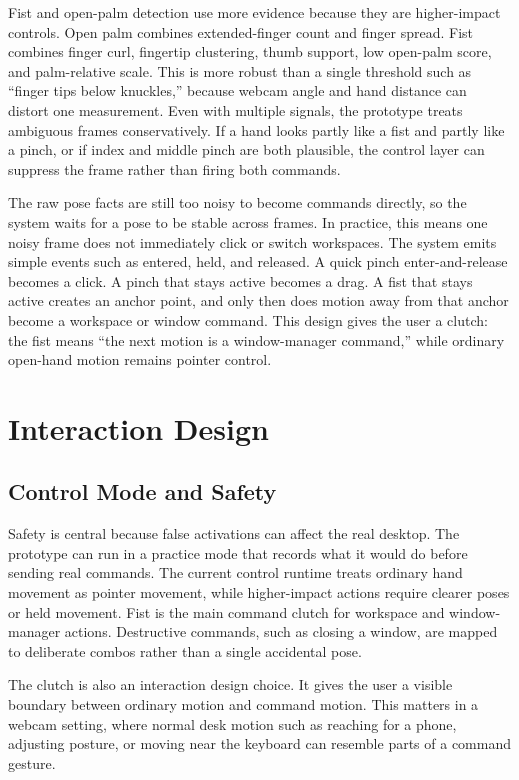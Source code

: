 \documentclass[manuscript]{acmart}
\begin{document}
Fist and open-palm detection use more evidence because they are higher-impact controls. Open palm combines extended-finger count and finger spread. Fist combines finger curl, fingertip clustering, thumb support, low open-palm score, and palm-relative scale. This is more robust than a single threshold such as ``finger tips below knuckles,'' because webcam angle and hand distance can distort one measurement. Even with multiple signals, the prototype treats ambiguous frames conservatively. If a hand looks partly like a fist and partly like a pinch, or if index and middle pinch are both plausible, the control layer can suppress the frame rather than firing both commands.

The raw pose facts are still too noisy to become commands directly, so the system waits for a pose to be stable across frames. In practice, this means one noisy frame does not immediately click or switch workspaces. The system emits simple events such as entered, held, and released. A quick pinch enter-and-release becomes a click. A pinch that stays active becomes a drag. A fist that stays active creates an anchor point, and only then does motion away from that anchor become a workspace or window command. This design gives the user a clutch: the fist means ``the next motion is a window-manager command,'' while ordinary open-hand motion remains pointer control.

\section{Interaction Design}

\subsection{Control Mode and Safety}

Safety is central because false activations can affect the real desktop. The prototype can run in a practice mode that records what it would do before sending real commands. The current control runtime treats ordinary hand movement as pointer movement, while higher-impact actions require clearer poses or held movement. Fist is the main command clutch for workspace and window-manager actions. Destructive commands, such as closing a window, are mapped to deliberate combos rather than a single accidental pose.

The clutch is also an interaction design choice. It gives the user a visible boundary between ordinary motion and command motion. This matters in a webcam setting, where normal desk motion such as reaching for a phone, adjusting posture, or moving near the keyboard can resemble parts of a command gesture.
\end{document}
